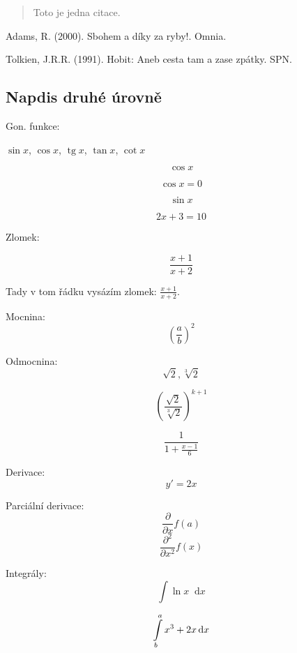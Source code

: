 \documentclass[a4paper, 12pt]{article}
\newcommand*\diff{\mathop{}\!\mathrm{d}}
\DeclareMathOperator{\tg}{tg}
\begin{document}
\begin{quote}
    Toto je jedna citace. \cite{Tolkien1991}
\end{quote}

\begin{thebibliography}{9}
    Adams, R. (2000). Sbohem a díky za ryby!. Omnia.

    Tolkien, J.R.R. (1991). Hobit: Aneb cesta tam a zase zpátky. SPN.

\end{thebibliography}

\lipsum

\subsection{Napdis druhé úrovně}
\lipsum[1-32]

Gon. funkce:

$\sin{x}$, $\cos{x}$, $\tg{x}$, $\tan{x}$, $\cot{x}$

$$ \cos{x} $$

\begin{equation*}
    \cos{x} = 0
\end{equation*}


\begin{equation}
    \sin{x}
\end{equation}

\begin{equation}
    2x + 3 = 10
\end{equation}

Zlomek:

\begin{equation}
    \frac{x + 1}{x + 2}
\end{equation}

Tady v tom řádku vysázím zlomek: $\frac{x + 1}{x + 2}$.

Mocnina:
$$ \left(\frac{a}{b}\right)^2 $$

Odmocnina:
$$ \sqrt{2}, \sqrt[3]{2} $$

$$ \left(
    \frac{\sqrt{2}}{\sqrt[3]{2}}
    \right)^{k + 1} $$

$$ \frac{1}{1 + \frac{x - 1}{6}} $$

Derivace:
$$ y'=2x $$

Parciální derivace:
$$ \frac{\partial}{\partial x} f(a)$$
$$ \frac{\partial^2}{\partial x^2} f(x)$$

Integrály:
$$ \int \ln{x} \diff{x} $$

$$ \int_{b}^{a}\limits x^3 + 2x \diff{x} $$  %
\end{document}
